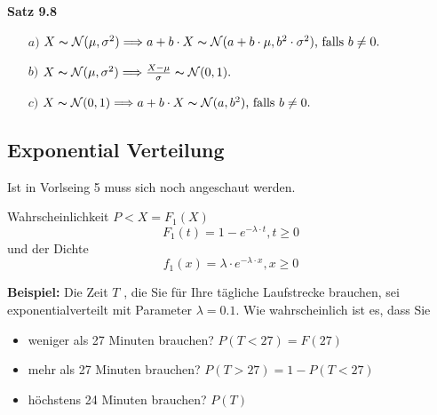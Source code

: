 \textbf{Satz 9.8}
\begin{itemize}
    \item [$a)$] $X\thicksim \mathcal{N} (\mu,\sigma^2)\Longrightarrow a+b\cdot X \thicksim \mathcal{N}(a+b\cdot\mu,b^2\cdot\sigma^2)\textrm{, falls } b\neq 0.$
    \item [$b)$] $X\thicksim \mathcal{N}(\mu,\sigma^2) \Longrightarrow \frac{X-\mu}{\sigma}\thicksim \mathcal{N}(0,1).$
    \item [$c)$] $X\thicksim \mathcal{N}(0,1) \Longrightarrow a+b\cdot X \thicksim \mathcal{N}(a,b^2)\textrm{, falls }b \neq 0.$
\end{itemize}

\subsection{Exponential Verteilung}
Ist in Vorlseing 5 muss sich noch angeschaut werden.

Wahrscheinlichkeit $P< X = F_1(X)$
\[F_1(t) = 1- e^{-\lambda\cdot t},t\geq 0\]
und der Dichte
\[f_1(x) = \lambda \cdot e^{-\lambda \cdot x}, x\geq 0\]

\textbf{Beispiel: }Die Zeit $T$ , die Sie für Ihre tägliche Laufstrecke brauchen, sei exponentialverteilt mit
Parameter $\lambda = 0.1$. Wie wahrscheinlich ist es, dass Sie
\begin{itemize}
    \item weniger als 27 Minuten brauchen? $P(T<27) = F(27)$
    \item mehr als 27 Minuten brauchen? $P(T>27)=1-P(T<27)$
    \item höchstens 24 Minuten brauchen?  $P(T)$
\end{itemize}

